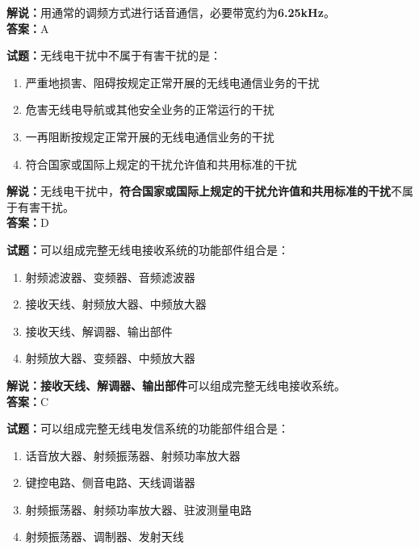 \documentclass{ctexbook}
\begin{document}
\noindent\textbf{解说：}用通常的调频方式进行话音通信，必要带宽约为\textbf{6.25kHz}。\\\noindent\textbf{答案：}A%


\bigskip


\noindent\textbf{试题：}无线电干扰中不属于有害干扰的是：

\begin{enumerate}[leftmargin=3em]
	\item 严重地损害、阻碍按规定正常开展的无线电通信业务的干扰
	\item 危害无线电导航或其他安全业务的正常运行的干扰
	\item 一再阻断按规定正常开展的无线电通信业务的干扰
	\item 符合国家或国际上规定的干扰允许值和共用标准的干扰
\end{enumerate}

\noindent\textbf{解说：}无线电干扰中，\textbf{符合国家或国际上规定的干扰允许值和共用标准的干扰}不属于有害干扰。\\\noindent\textbf{答案：}D%


\bigskip


\noindent\textbf{试题：}可以组成完整无线电接收系统的功能部件组合是：

\begin{enumerate}[leftmargin=3em]
	\item 射频滤波器、变频器、音频滤波器
	\item 接收天线、射频放大器、中频放大器
	\item 接收天线、解调器、输出部件
	\item 射频放大器、变频器、中频放大器
\end{enumerate}

\noindent\textbf{解说：}\textbf{接收天线、解调器、输出部件}可以组成完整无线电接收系统。\\\noindent\textbf{答案：}C%


\bigskip


\noindent\textbf{试题：}可以组成完整无线电发信系统的功能部件组合是：

\begin{enumerate}[leftmargin=3em]
	\item 话音放大器、射频振荡器、射频功率放大器
	\item 键控电路、侧音电路、天线调谐器
	\item 射频振荡器、射频功率放大器、驻波测量电路
	\item 射频振荡器、调制器、发射天线
\end{enumerate}
\end{document}
